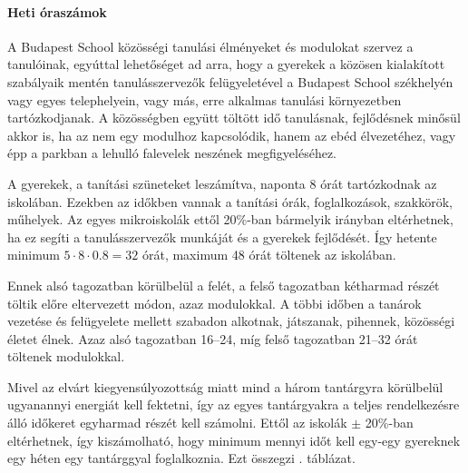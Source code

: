 \paragraph{Heti óraszámok}

A Budapest School közösségi tanulási élményeket és modulokat szervez a
tanulóinak, egyúttal lehetőséget ad arra, hogy a gyerekek a közösen kialakított
szabályaik mentén tanulásszervezők felügyeletével a Budapest School székhelyén
vagy egyes telephelyein, vagy más, erre alkalmas tanulási környezetben
tartózkodjanak. A közösségben együtt töltött idő tanulásnak, fejlődésnek
minősül akkor is, ha az nem egy modulhoz kapcsolódik, hanem az ebéd
élvezetéhez, vagy épp a parkban a lehulló falevelek neszének megfigyeléséhez.

A gyerekek, a tanítási szüneteket leszámítva, naponta 8 órát tartózkodnak az
iskolában. Ezekben az időkben vannak a tanítási órák, foglalkozások, szakkörök,
műhelyek. Az egyes mikroiskolák ettől 20\%-ban bármelyik irányban eltérhetnek,
ha ez segíti a tanulásszervezők munkáját és a gyerekek fejlődését. Így hetente
minimum $5 \cdot 8 \cdot 0.8 = 32$ órát, maximum 48 órát töltenek az iskolában.

Ennek alsó tagozatban körülbelül a felét, a felső tagozatban kétharmad részét
töltik előre eltervezett módon, azaz modulokkal. A többi időben a tanárok
vezetése és felügyelete mellett szabadon alkotnak, játszanak, pihennek,
közösségi életet élnek. Azaz alsó tagozatban 16--24, míg felső tagozatban
21--32 órát töltenek modulokkal.

Mivel az elvárt kiegyensúlyozottság miatt mind a három tantárgyra körülbelül
ugyanannyi energiát kell fektetni, így az egyes tantárgyakra a teljes
rendelkezésre álló időkeret egyharmad részét kell számolni. Ettől az iskolák
$\pm$ 20\%-ban eltérhetnek, így kiszámolható, hogy minimum mennyi időt kell
egy-egy gyereknek egy héten egy tantárggyal foglalkoznia. Ezt összegzi
. táblázat.

